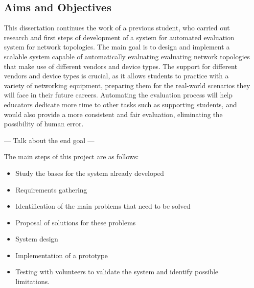 \subsection{Aims and Objectives}
This dissertation continues the work of a previous student, who carried out research and first steps of development of a 
system for automated evaluation system for network topologies. The main goal is to design and implement a scalable system 
capable of automatically evaluating evaluating network topologies that make use of different vendors and device types.
The support for different vendors and device types is crucial, as it allows students to practice with a variety of
networking equipment, preparing them for the real-world scenarios they will face in their future careers.
Automating the evaluation process will help educators dedicate more time to other tasks such as supporting students, and
would also provide a more consistent and fair evaluation, eliminating the possibility of human error.

--- Talk about the end goal ---

The main steps of this project are as follows:

\begin{itemize}
    \item Study the bases for the system already developed
    \item Requirements gathering
    \item Identification of the main problems that need to be solved
    \item Proposal of solutions for these problems
    \item System design
    \item Implementation of a prototype
    \item Testing with volunteers to validate the system and identify possible limitations.
  \end{itemize}
